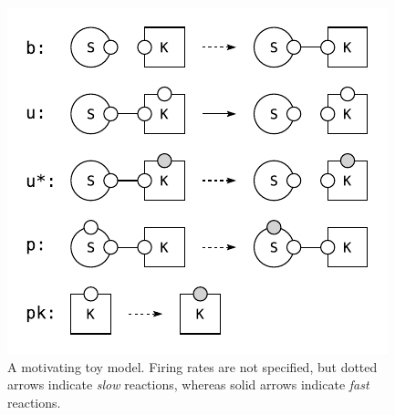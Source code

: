 \begin{figure}[h]
  \vskip -0.2cm
  \begin{center}
    \includegraphics[scale=0.9]{figures/model.pdf}
  \end{center}
  \vskip -0.2cm
  \caption{A motivating toy model.   Firing rates are not specified, but
    dotted arrows indicate \textit{slow} reactions, whereas solid
    arrows indicate \textit{fast} reactions.}
  \label{fig:model}
\end{figure}
